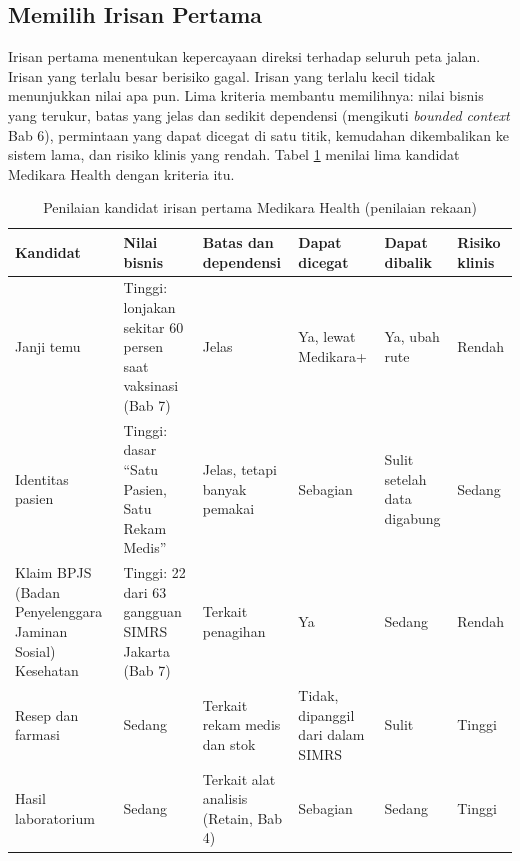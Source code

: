 \subsection{Memilih Irisan Pertama}

Irisan pertama menentukan kepercayaan direksi terhadap seluruh peta jalan. Irisan yang terlalu besar
berisiko gagal. Irisan yang terlalu kecil tidak menunjukkan nilai apa pun. Lima kriteria membantu
memilihnya: nilai bisnis yang terukur, batas yang jelas dan sedikit dependensi (mengikuti
\textit{bounded context} Bab 6), permintaan yang dapat dicegat di satu titik, kemudahan dikembalikan
ke sistem lama, dan risiko klinis yang rendah. Tabel \ref{tab:ch14-irisan-pertama} menilai lima
kandidat Medikara Health dengan kriteria itu.

\begin{table}[!htb]
  \centering
  \caption{Penilaian kandidat irisan pertama Medikara Health (penilaian rekaan)}
  \label{tab:ch14-irisan-pertama}
  \footnotesize
  \begin{tabularx}{\textwidth}{>{\raggedright\arraybackslash}p{2.0cm}
      >{\raggedright\arraybackslash}X >{\raggedright\arraybackslash}p{1.5cm}
      >{\raggedright\arraybackslash}p{1.5cm} >{\raggedright\arraybackslash}p{1.4cm}
      >{\raggedright\arraybackslash}p{1.6cm}}
    \hline
    \textbf{Kandidat} & \textbf{Nilai bisnis} & \textbf{Batas dan dependensi} &
      \textbf{Dapat dicegat} & \textbf{Dapat dibalik} & \textbf{Risiko klinis} \\ \hline
    Janji temu & Tinggi: lonjakan sekitar 60 persen saat vaksinasi (Bab 7) & Jelas & Ya, lewat
      Medikara+ & Ya, ubah rute & Rendah \\ \hline
    Identitas pasien & Tinggi: dasar ``Satu Pasien, Satu Rekam Medis'' & Jelas, tetapi banyak
      pemakai & Sebagian & Sulit setelah data digabung & Sedang \\ \hline
    Klaim BPJS (Badan Penyelenggara Jaminan Sosial) Kesehatan & Tinggi: 22 dari 63 gangguan SIMRS
      Jakarta (Bab 7) & Terkait penagihan &
      Ya & Sedang & Rendah \\ \hline
    Resep dan farmasi & Sedang & Terkait rekam medis dan stok & Tidak, dipanggil dari dalam SIMRS
      & Sulit & Tinggi \\ \hline
    Hasil laboratorium & Sedang & Terkait alat analisis (Retain, Bab 4) & Sebagian & Sedang &
      Tinggi \\ \hline
  \end{tabularx}
\end{table}

